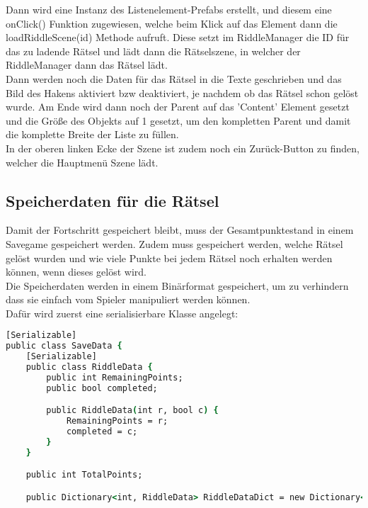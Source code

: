 {Dann wird eine Instanz des Listenelement-Prefabs erstellt, und diesem eine onClick() Funktion zugewiesen, welche beim Klick auf das Element dann die loadRiddleScene(id) Methode aufruft. Diese setzt im RiddleManager die ID für das zu ladende Rätsel und lädt dann die Rätselszene, in welcher der RiddleManager dann das Rätsel lädt.\\
Dann werden noch die Daten für das Rätsel in die Texte geschrieben und das Bild des Hakens aktiviert bzw deaktiviert, je nachdem ob das Rätsel schon gelöst wurde. Am Ende wird dann noch der Parent auf das 'Content' Element gesetzt und die Größe des Objekts auf 1 gesetzt, um den kompletten Parent und damit die komplette Breite der Liste zu füllen.\\

In der oberen linken Ecke der Szene ist zudem noch ein Zurück-Button zu finden, welcher die Hauptmenü Szene lädt.

\subsection{Speicherdaten für die Rätsel}
Damit der Fortschritt gespeichert bleibt, muss der Gesamtpunktestand in einem Savegame gespeichert werden. Zudem muss gespeichert werden, welche Rätsel gelöst wurden und wie viele Punkte bei jedem Rätsel noch erhalten werden können, wenn dieses gelöst wird.\\

Die Speicherdaten werden in einem Binärformat gespeichert, um zu verhindern dass sie einfach vom Spieler manipuliert werden können.\\
Dafür wird zuerst eine serialisierbare Klasse angelegt:
\begin{lstlisting}[language=csh, caption={Serialisierbare Speicherdaten für die Rätsel}]
[Serializable]
public class SaveData {
    [Serializable]
    public class RiddleData {
        public int RemainingPoints;
		public bool completed;

        public RiddleData(int r, bool c) {
            RemainingPoints = r;
            completed = c;
        }
    }

    public int TotalPoints;

    public Dictionary<int, RiddleData> RiddleDataDict = new Dictionary<int, RiddleData>();


\end{lstlisting}}
